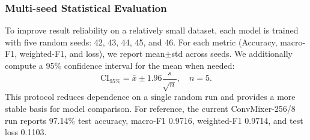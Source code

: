 \subsubsection*{Multi-seed Statistical Evaluation}
To improve result reliability on a relatively small dataset, each model is trained with five random seeds: 42, 43, 44, 45, and 46. For each metric (Accuracy, macro-F1, weighted-F1, and loss), we report mean$\pm$std across seeds. We additionally compute a 95\% confidence interval for the mean when needed:
\[
\mathrm{CI}_{95\%} = \bar{x} \pm 1.96\frac{s}{\sqrt{n}}, \quad n=5.
\]
This protocol reduces dependence on a single random run and provides a more stable basis for model comparison. For reference, the current ConvMixer-256/8 run reports 97.14\% test accuracy, macro-F1 0.9716, weighted-F1 0.9714, and test loss 0.1103.
